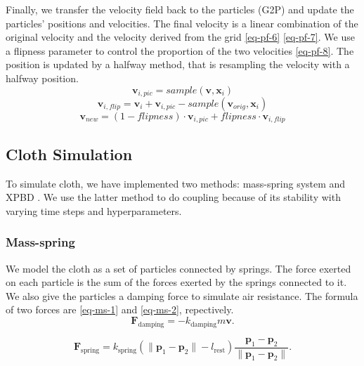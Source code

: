 Finally, we transfer the velocity field back to the particles (G2P) and update the particles' positions and velocities. The final velocity is a linear combination of the original velocity and the velocity derived from the grid \eqref{eq-pf-6} \eqref{eq-pf-7}. We use a flipness parameter to control the proportion of the two velocities \eqref{eq-pf-8}. The position is updated by a halfway method, that is resampling the velocity with a halfway position.
\begin{equation}
  \label{eq-pf-6}
  \mathbf{v}_{i,pic}=sample(\mathbf{v},\mathbf{x}_i)
\end{equation}
\begin{equation}
  \label{eq-pf-7}
  \mathbf{v}_{i,flip}=\mathbf{v}_i+\mathbf{v}_{i,pic}-sample(\mathbf{v}_{orig},\mathbf{x}_i)
\end{equation}
\begin{equation}
  \label{eq-pf-8}
  \mathbf{v}_{new}=(1-flipness)\cdot\mathbf{v}_{i,pic}+flipness\cdot\mathbf{v}_{i,flip}
\end{equation}

\subsection{Cloth Simulation}

To simulate cloth, we have implemented two methods: mass-spring system and XPBD \cite{10.1145/2994258.2994272}. We use the latter method to do coupling because of its stability with varying time steps and hyperparameters.

\subsubsection{Mass-spring}

We model the cloth as a set of particles connected by springs. The force exerted on each particle is the sum of the forces exerted by the springs connected to it. We also give the particles a damping force to simulate air resistance. The formula of two forces are \eqref{eq-ms-1} and \eqref{eq-ms-2}, repectively.
\begin{equation}
  \label{eq-ms-1}
\mathbf{F}_{\text{damping}}=-k_{\text{damping}}m\mathbf{v}.
\end{equation}

\begin{equation}
  \label{eq-ms-2}
\mathbf{F}_{\text{spring}}=k_{\text{spring}}(\|\mathbf{p}_1-\mathbf{p}_2\|-l_{\text{rest}})\frac{\mathbf{p}_1-\mathbf{p}_2}{\|\mathbf{p}_1-\mathbf{p}_2\|}.
\end{equation}

